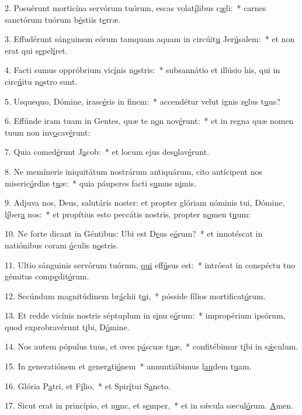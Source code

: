 2. Posuérunt morticína servórum tuórum, escas volat\uline{í}libus c\uline{æ}li:~* carnes sanctórum tuórum b\uline{é}stiis t\uline{e}rræ.\par 
3. Effudérunt sánguinem eórum tamquam aquam in circúit\uline{u} Jer\uline{ú}salem:~* et non erat qui s\uline{e}pel\uline{í}ret.\par 
4. Facti sumus oppróbrium vic\uline{í}nis n\uline{o}stris:~* subsannátio et illúsio his, qui in circ\uline{ú}itu n\uline{o}stro sunt.\par 
5. Usquequo, Dómine, irasc\uline{é}ris in f\uline{i}nem:~* accendétur velut ignis z\uline{e}lus t\uline{u}us?\par 
6. Effúnde iram tuam in Gentes, quæ te n\uline{o}n nov\uline{é}runt:~* et in regna quæ nomen tuum non inv\uline{o}cav\uline{é}runt:\par 
7. Quia comed\uline{é}runt J\uline{a}cob:~* et locum ejus des\uline{o}lav\uline{é}runt.\par 
8. Ne memíneris iniquitátum nostrárum antiquárum, cito antícipent nos miseric\uline{ó}rdiæ t\uline{u}æ:~* quia páuperes facti s\uline{u}mus n\uline{i}mis.\par 
9. Adjuva nos, Deus, salutáris noster: et propter glóriam nóminis tui, Dómine, l\uline{í}ber\uline{a} nos:~* et propítius esto peccátis nostris, propter n\uline{o}men t\uline{u}um:\par 
10. Ne forte dicant in Géntibus: Ubi est D\uline{e}us e\uline{ó}rum?~* et innotéscat in natiónibus coram \uline{ó}culis n\uline{o}stris.\par 
11. Ultio sánguinis servórum tuórum, \uline{qui} eff\uline{ú}sus est:~* intróeat in conspéctu tuo gémitus comp\uline{e}dit\uline{ó}rum.\par 
12. Secúndum magnitúdinem br\uline{á}chii t\uline{u}i,~* pósside fílios mortif\uline{i}cat\uline{ó}rum.\par 
13. Et redde vicínis nostris séptuplum in s\uline{i}nu e\uline{ó}rum:~* impropérium ipsórum, quod exprobravérunt t\uline{i}bi, D\uline{ó}mine.\par 
14. Nos autem pópulus tuus, et oves p\uline{á}scuæ t\uline{u}æ,~* confitébimur t\uline{i}bi in s\uline{ǽ}culum.\par 
15. In generatiónem et gener\uline{a}ti\uline{ó}nem~* annuntiábimus l\uline{au}dem t\uline{u}am.\par 
16. Glória P\uline{a}tri, et F\uline{í}lio,~* et Spir\uline{í}tui S\uline{a}ncto.\par 
17. Sicut erat in princípio, et n\uline{u}nc, et s\uline{e}mper,~* et in sǽcula sæcul\uline{ó}rum. \uline{A}men.\par 
